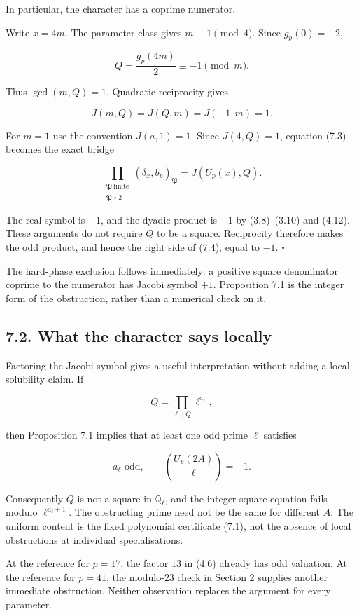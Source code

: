 \documentclass[11pt,a4paper]{article}
\begin{document}
In particular, the character has a coprime numerator.

Write \(x=4m\). The parameter class gives \(m\equiv1\pmod4\). Since
\(g_p(0)=-2\),

\[
Q=\frac{g_p(4m)}2\equiv-1\pmod m.
\]

Thus \(\gcd(m,Q)=1\). Quadratic reciprocity gives

\[
J(m,Q)=J(Q,m)=J(-1,m)=1.
\]

For \(m=1\) use the convention \(J(a,1)=1\). Since \(J(4,Q)=1\),
equation (7.3) becomes the exact bridge

\[
\boxed{
\prod_{\substack{\mathfrak P\ \mathrm{finite}\\\mathfrak P\nmid2}}
(\delta_x,b_p)_{\mathfrak P}
=J(U_p(x),Q).
}
\tag{7.4}
\]

The real symbol is \(+1\), and the dyadic product is \(-1\) by
(3.8)--(3.10) and (4.12). These arguments do not require \(Q\) to be a
square. Reciprocity therefore makes the odd product, and hence the right
side of (7.4), equal to \(-1\). \(\square\)

The hard-phase exclusion follows immediately: a positive square
denominator coprime to the numerator has Jacobi symbol \(+1\).
Proposition 7.1 is the integer form of the obstruction, rather than a
numerical check on it.

\subsection{7.2. What the character says
locally}\label{local-consequence}

Factoring the Jacobi symbol gives a useful interpretation without adding
a local-solubility claim. If

\[
Q=\prod_{\ell\mid Q}\ell^{a_\ell},
\]

then Proposition 7.1 implies that at least one odd prime \(\ell\)
satisfies

\[
a_\ell\text{ odd},\qquad
\left(\frac{U_p(2A)}{\ell}\right)=-1.
\tag{7.5}
\]

Consequently \(Q\) is not a square in \(\mathbb Q_\ell\), and the
integer square equation fails modulo \(\ell^{a_\ell+1}\). The
obstructing prime need not be the same for different \(A\). The uniform
content is the fixed polynomial certificate (7.1), not the absence of
local obstructions at individual specialisations.

At the reference for \(p=17\), the factor \(13\) in (4.6) already has
odd valuation. At the reference for \(p=41\), the modulo-\(23\) check in
Section 2 supplies another immediate obstruction. Neither observation
replaces the argument for every parameter.
\end{document}

